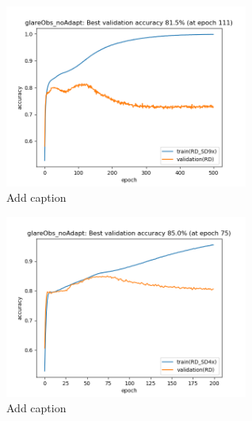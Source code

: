 \begin{minipage}{0.5\textwidth}
	\begin{figure}[H]
		\centering
		\includegraphics[width=8cm]{images/bestHistories/2d_30s_sd9x_acc.png}
		\caption[Bild kurz]{Add caption}
		\label{fig:2d30}
	\end{figure}
\end{minipage}
\begin{minipage}{0.5\textwidth}
	\begin{figure}[H]
		\centering
		\includegraphics[width=8cm]{images/bestHistories/2d_40s_sd4x_acc.png}
		\caption[Bild kurz]{Add caption}
		\label{fig:2d40}
	\end{figure}
\end{minipage}


